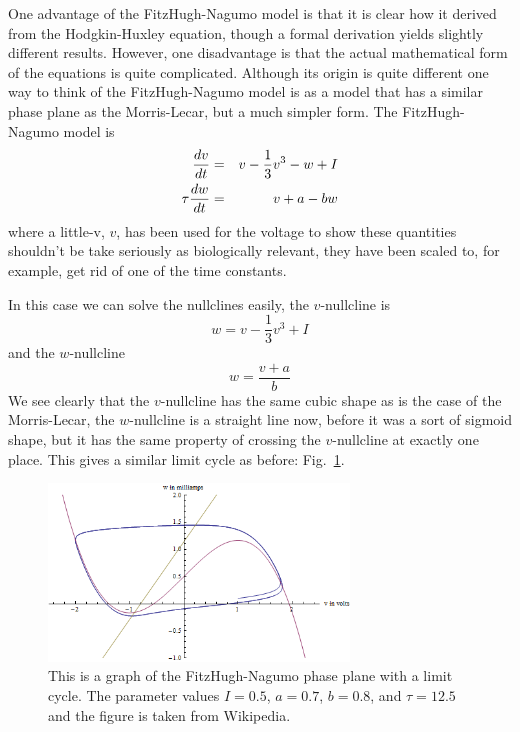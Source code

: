 \documentclass[12pt]{article}
\begin{document}
One advantage of the FitzHugh-Nagumo model
\cite{FitzHugh1955,Nagumo1962} is that it is clear how it derived from
the Hodgkin-Huxley equation, though a formal derivation yields
slightly different results. However, one disadvantage is that the
actual mathematical form of the equations is quite
complicated. Although its origin is quite different one way to think
of the FitzHugh-Nagumo model is as a model that has a similar phase
plane as the Morris-Lecar, but a much simpler form. The
FitzHugh-Nagumo model is
\begin{eqnarray}
\frac{dv}{dt}&=&v-\frac{1}{3}v^3-w+I\cr
\tau\frac{dw}{dt}&=&v+a-bw
\end{eqnarray}
where a little-v, $v$, has been used for the voltage to show these
quantities shouldn't be take seriously as biologically relevant, they
have been scaled to, for example, get rid of one of the time
constants. 

In this case we can solve the nullclines easily, the $v$-nullcline is
\begin{equation}
w=v-\frac{1}{3}v^3+I
\end{equation}
and the $w$-nullcline
\begin{equation}
w=\frac{v+a}{b}
\end{equation}
We see clearly that the $v$-nullcline has the same cubic shape as is
the case of the Morris-Lecar, the $w$-nullcline is a straight line
now, before it was a sort of sigmoid shape, but it has the same
property of crossing the $v$-nullcline at exactly one place. This gives a similar limit cycle as before: Fig.~\ref{FHN_phase}.

\begin{figure}
\begin{center}
\includegraphics[width=8cm]{FHN_phase.png}
\end{center}
\caption{This is a graph of the FitzHugh-Nagumo phase plane with a limit cycle. The parameter values $I=0.5$, $a=0.7$, $b=0.8$, and $\tau=12.5$ and the figure is taken from Wikipedia.\label{FHN_phase}}
\end{figure}
\end{document}
